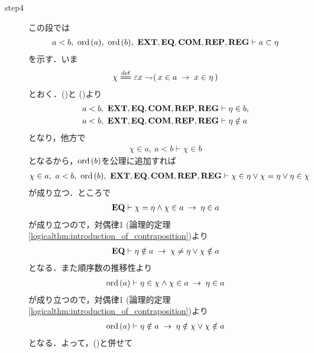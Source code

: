 \begin{prf}
\begin{description}
			\item[step4] この段では
				\begin{align}
					a < b,\ \ord{a},\ \ord{b},\ \EXTAX,\EQAX,\COMAX,\REPAX,\REGAX \vdash a \subset \eta 
				\end{align}
				を示す．いま
				\begin{align}
					\chi \defeq \varepsilon x \negation (\, x \in a \rarrow x \in \eta\, )
				\end{align}
				とおく．()と
				()より
				\begin{align}
					a < b,\ \mbox{{\bf EXT}},\mbox{{\bf EQ}},\mbox{\bf COM},\mbox{{\bf REP}},\mbox{{\bf REG}} &\vdash \eta \in b, 
					\label{fom:element_and_proper_subset_correspond_11} \\
					a < b,\ \mbox{{\bf EXT}},\mbox{{\bf EQ}},\mbox{\bf COM},\mbox{{\bf REP}},\mbox{{\bf REG}} &\vdash \eta \notin a
					\label{fom:element_and_proper_subset_correspond_12}
				\end{align}
				となり，他方で
				\begin{align}
					\chi \in a,\ a < b \vdash \chi \in b
				\end{align}
				となるから，$\operatorname*{ord}\hspace{0.15em}(b)$を公理に追加すれば
				\begin{align}
					\chi \in a,\ a < b,\ \ord{b},\ \EXTAX,\EQAX,\COMAX,\REPAX,\REGAX 
					\vdash \chi \in \eta \vee \chi = \eta \vee \eta \in \chi
					\label{fom:element_and_proper_subset_correspond_13}
				\end{align}
				が成り立つ．ところで
				\begin{align}
					\mbox{{\bf EQ}} \vdash \chi = \eta \wedge \chi \in a \hspace{0.25em}\rightarrow\hspace{0.25em} \eta \in a
				\end{align}
				が成り立つので，対偶律1 (論理的定理\ref{logicalthm:introduction_of_contraposition})より
				\begin{align}
					\mbox{{\bf EQ}} \vdash \eta \notin a \hspace{0.25em}\rightarrow\hspace{0.25em} \chi \neq \eta \vee \chi \notin a
				\end{align}
				となる．また順序数の推移性より
				\begin{align}
					\operatorname*{ord}\hspace{0.15em}(a) \vdash \eta \in \chi \wedge \chi \in a \hspace{0.25em}\rightarrow\hspace{0.25em} \eta \in a
				\end{align}
				が成り立つので，対偶律1 (論理的定理\ref{logicalthm:introduction_of_contraposition})より
				\begin{align}
					\operatorname*{ord}\hspace{0.15em}(a) \vdash \eta \notin a \hspace{0.25em}\rightarrow\hspace{0.25em} \eta \notin \chi \vee \chi \notin a
				\end{align}
				となる．よって，()と併せて

\end{description}
\end{prf}
